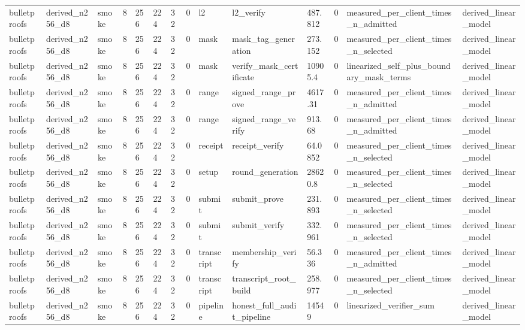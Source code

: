 \begin{table}[t]
\begin{tabular}{llllllllllllll}
bulletproofs & derived\_n256\_d8 & smoke & 8 & 256 & 224 & 32 & 0 & l2 & l2\_verify & 487.812 & 0 & measured\_per\_client\_times\_n\_admitted & derived\_linear\_model \\
bulletproofs & derived\_n256\_d8 & smoke & 8 & 256 & 224 & 32 & 0 & mask & mask\_tag\_generation & 273.152 & 0 & measured\_per\_client\_times\_n\_selected & derived\_linear\_model \\
bulletproofs & derived\_n256\_d8 & smoke & 8 & 256 & 224 & 32 & 0 & mask & verify\_mask\_certificate & 10905.4 & 0 & linearized\_self\_plus\_boundary\_mask\_terms & derived\_linear\_model \\
bulletproofs & derived\_n256\_d8 & smoke & 8 & 256 & 224 & 32 & 0 & range & signed\_range\_prove & 4617.31 & 0 & measured\_per\_client\_times\_n\_admitted & derived\_linear\_model \\
bulletproofs & derived\_n256\_d8 & smoke & 8 & 256 & 224 & 32 & 0 & range & signed\_range\_verify & 913.68 & 0 & measured\_per\_client\_times\_n\_admitted & derived\_linear\_model \\
bulletproofs & derived\_n256\_d8 & smoke & 8 & 256 & 224 & 32 & 0 & receipt & receipt\_verify & 64.0852 & 0 & measured\_per\_client\_times\_n\_selected & derived\_linear\_model \\
bulletproofs & derived\_n256\_d8 & smoke & 8 & 256 & 224 & 32 & 0 & setup & round\_generation & 28620.8 & 0 & measured\_per\_client\_times\_n\_selected & derived\_linear\_model \\
bulletproofs & derived\_n256\_d8 & smoke & 8 & 256 & 224 & 32 & 0 & submit & submit\_prove & 231.893 & 0 & measured\_per\_client\_times\_n\_selected & derived\_linear\_model \\
bulletproofs & derived\_n256\_d8 & smoke & 8 & 256 & 224 & 32 & 0 & submit & submit\_verify & 332.961 & 0 & measured\_per\_client\_times\_n\_selected & derived\_linear\_model \\
bulletproofs & derived\_n256\_d8 & smoke & 8 & 256 & 224 & 32 & 0 & transcript & membership\_verify & 56.336 & 0 & measured\_per\_client\_times\_n\_admitted & derived\_linear\_model \\
bulletproofs & derived\_n256\_d8 & smoke & 8 & 256 & 224 & 32 & 0 & transcript & transcript\_root\_build & 258.977 & 0 & measured\_per\_client\_times\_n\_selected & derived\_linear\_model \\
bulletproofs & derived\_n256\_d8 & smoke & 8 & 256 & 224 & 32 & 0 & pipeline & honest\_full\_audit\_pipeline & 14549 & 0 & linearized\_verifier\_sum & derived\_linear\_model \\
\bottomrule
\end{tabular}
\end{table}
